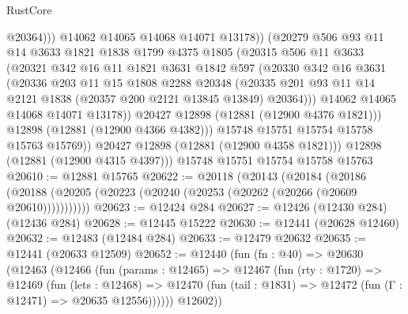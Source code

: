 \begin{lexlean}{RustCore}
\begin{coremodule}
                        @20364)))
                  @14062
                  @14065
                  @14068
                  @14071
                  @13178))
              (@20279
                @506
                @93
                @11
                @14
                @3633
                @1821
                @1838
                @1799
                @4375
                @1805
                (@20315
                  @506
                  @11
                  @3633
                  (@20321
                    @342
                    @16
                    @11
                    @1821
                    @3631
                    @1842
                    @597
                    (@20330
                      @342
                      @16
                      @3631
                      (@20336
                        @203
                        @11
                        @15
                        @1808
                        @2288
                        @20348
                        (@20335
                          @201
                          @93
                          @11
                          @14
                          @2121
                          @1838
                          (@20357 @200 @2121 @13845 @13849)
                          @20364)))
                    @14062
                    @14065
                    @14068
                    @14071
                    @13178))
                @20427
                @12898
                (@12881 (@12900 @4376 @1821)))
              @12898
              (@12881 (@12900 @4366 @4382)))
            @15748
            @15751
            @15754
            @15758
            @15763
            @15769))
        @20427
        @12898
        (@12881 (@12900 @4358 @1821)))
      @12898
      (@12881 (@12900 @4315 @4397)))
    @15748
    @15751
    @15754
    @15758
    @15763
@20610 := @12881 @15765
@20622 := @20118
    (@20143
      (@20184
        (@20186 (@20188 (@20205 (@20223 (@20240 (@20253 (@20262 (@20266 (@20609 @20610)))))))))))
@20623 := @12424 @284
@20627 := @12426 (@12430 @284) (@12436 @284)
@20628 := @12445 @15222
@20630 := @12441 (@20628 @12460)
@20632 := @12483 (@12484 @284)
@20633 := @12479 @20632
@20635 := @12441 (@20633 @12509)
@20652 := @12440
    (fun (fn : @40) =>
    @20630
      (@12463
        (@12466
          (fun (params : @12465) =>
          @12467
            (fun (rty : @1720) =>
            @12469
              (fun (lets : @12468) =>
              @12470 (fun (tail : @1831) => @12472 (fun (Γ : @12471) => @20635 @12556))))))
        @12602))

\end{coremodule}
\end{lexlean}
